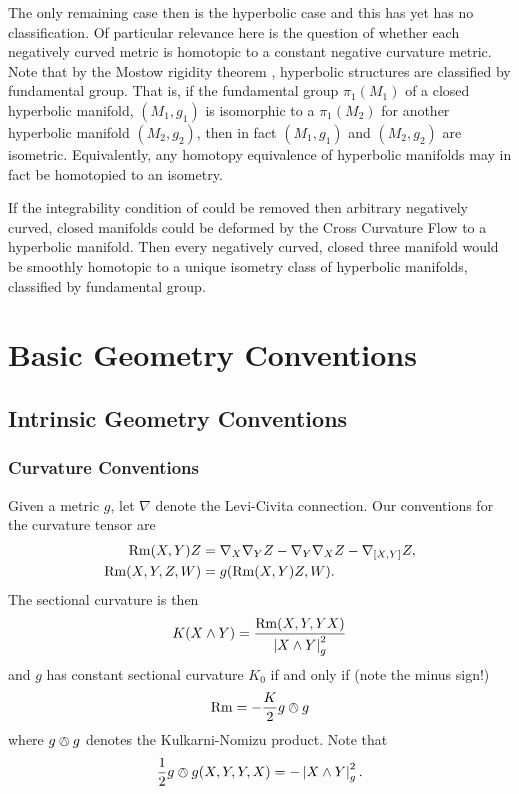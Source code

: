 \documentclass[a4paper, 12pt]{amsart}
\begin{document}
The only remaining case then is the hyperbolic case and this has yet has no classification. Of particular relevance here is the question of whether each negatively curved metric is homotopic to a constant negative curvature metric. Note that by the Mostow rigidity theorem \cite{MR0236383}, hyperbolic structures are classified by fundamental group. That is, if the fundamental group \(\pi_1(M_1)\) of a closed hyperbolic manifold, \((M_1, g_1)\) is isomorphic to a \(\pi_1(M_2)\) for another hyperbolic manifold \((M_2, g_2)\), then in fact \((M_1, g_1)\) and \((M_2, g_2)\) are isometric. Equivalently, any homotopy equivalence of hyperbolic manifolds may in fact be homotopied to an isometry.

If the integrability condition of  could be removed then arbitrary negatively curved, closed manifolds could be deformed by the Cross Curvature Flow to a hyperbolic manifold. Then every negatively curved, closed three manifold would be smoothly homotopic to a unique isometry class of hyperbolic manifolds, classified by fundamental group.

\section{Basic Geometry Conventions}
\label{sec:notation}
\subsection{Intrinsic Geometry Conventions}
\label{subsec:notation_intrinsic}

\subsubsection{Curvature Conventions}
\label{subsubsec:notation_intrinsic_curvature}

Given a metric \(g\), let \(\nabla\) denote the Levi-Civita connection. Our conventions for the curvature tensor are
\[
\begin{split}
\operatorname{Rm}(X, Y) Z &= \nabla_X \nabla_Y Z - \nabla_Y \nabla_X Z - \nabla_{[X, Y]} Z, \\
\operatorname{Rm}(X, Y, Z, W) &= g(\operatorname{Rm}(X, Y) Z, W).
\end{split}
\]
The sectional curvature is then
\[
K(X \wedge Y) = \frac{\operatorname{Rm}(X, Y, Y X)}{\left\lvert{X \wedge Y}\right\rvert_g^2}
\]
and \(g\) has constant sectional curvature \(K_0\) if and only if (note the minus sign!)
\[
\operatorname{Rm} = -\frac{K}{2} g \owedge g
\]
where \(g \owedge g\) denotes the Kulkarni-Nomizu product. Note that
\[
\frac{1}{2} g \owedge g (X, Y, Y, X) = -\left\lvert{X \wedge Y}\right\rvert_g^2.
\]
\end{document}
